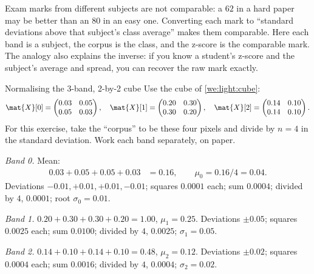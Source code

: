 \begin{analogy}
Exam marks from different subjects are not comparable: a $62$ in a hard paper may be better than an
$80$ in an easy one. Converting each mark to ``standard deviations above that subject's class
average'' makes them comparable. Here each band is a subject, the corpus is the class, and the
z-score is the comparable mark. The analogy also explains the inverse: if you know a student's
z-score and the subject's average and spread, you can recover the raw mark exactly.
\end{analogy}

\begin{worked}[label={we:bandpipeline:zscore}]{Normalising the 3-band, 2-by-2 cube}
Use the cube of \cref{we:light:cube}:
\[
\mat{X}[0] = \begin{pmatrix} 0.03 & 0.05 \\ 0.05 & 0.03 \end{pmatrix},\quad
\mat{X}[1] = \begin{pmatrix} 0.20 & 0.30 \\ 0.30 & 0.20 \end{pmatrix},\quad
\mat{X}[2] = \begin{pmatrix} 0.14 & 0.10 \\ 0.14 & 0.10 \end{pmatrix}.
\]
For this exercise, take the ``corpus'' to be these four pixels and divide by $n = 4$ in the standard
deviation. Work each band separately, on paper.

\emph{Band 0.} Mean:
\begin{align*}
0.03 + 0.05 + 0.05 + 0.03 &= 0.16, \qquad \mu_0 = 0.16/4 = 0.04.
\end{align*}
Deviations $-0.01, +0.01, +0.01, -0.01$; squares $0.0001$ each; sum $0.0004$; divided by $4$,
$0.0001$; root $\sigma_0 = 0.01$.

\emph{Band 1.} $0.20 + 0.30 + 0.30 + 0.20 = 1.00$, $\mu_1 = 0.25$. Deviations $\pm 0.05$; squares
$0.0025$ each; sum $0.0100$; divided by $4$, $0.0025$; $\sigma_1 = 0.05$.

\emph{Band 2.} $0.14 + 0.10 + 0.14 + 0.10 = 0.48$, $\mu_2 = 0.12$. Deviations $\pm 0.02$; squares
$0.0004$ each; sum $0.0016$; divided by $4$, $0.0004$; $\sigma_2 = 0.02$.


\end{worked}
